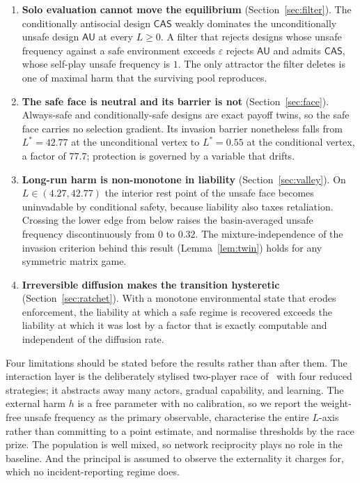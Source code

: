 \documentclass[11pt,a4paper]{article}
\theoremstyle{definition}
\newcommand{\AU}{\textsf{AU}}
\newcommand{\CAS}{\textsf{CAS}}
\begin{document}
\begin{enumerate}
\item \textbf{Solo evaluation cannot move the equilibrium}
(Section~\ref{sec:filter}). The conditionally antisocial design $\CAS$ weakly
dominates the unconditionally unsafe design $\AU$ at every $L\ge0$. A filter
that rejects designs whose unsafe frequency against a safe environment exceeds
$\varepsilon$ rejects $\AU$ and admits $\CAS$, whose self-play unsafe
frequency is $1$. The only attractor the filter deletes is one of maximal
harm that the surviving pool reproduces.

\item \textbf{The safe face is neutral and its barrier is not}
(Section~\ref{sec:face}). Always-safe and conditionally-safe designs are exact
payoff twins, so the safe face carries no selection gradient. Its invasion
barrier nonetheless falls from $L^{*}=42.77$ at the unconditional vertex to
$L^{*}=0.55$ at the conditional vertex, a factor of $77.7$; protection is
governed by a variable that drifts.

\item \textbf{Long-run harm is non-monotone in liability}
(Section~\ref{sec:valley}). On $L\in(4.27,42.77)$ the interior rest point of
the unsafe face becomes uninvadable by conditional safety, because liability
also taxes retaliation. Crossing the lower edge from below raises the
basin-averaged unsafe frequency discontinuously from $0$ to $0.32$. The
mixture-independence of the invasion criterion behind this result
(Lemma~\ref{lem:twin}) holds for any symmetric matrix game.

\item \textbf{Irreversible diffusion makes the transition hysteretic}
(Section~\ref{sec:ratchet}). With a monotone environmental state that erodes
enforcement, the liability at which a safe regime is recovered exceeds the
liability at which it was lost by a factor that is exactly computable and
independent of the diffusion rate.
\end{enumerate}

Four limitations should be stated before the results rather than after them.
The interaction layer is the deliberately stylised two-player race of~\citet{domingos2026falling} with four reduced strategies; it abstracts away
many actors, gradual capability, and learning. The external harm $h$ is a free
parameter with no calibration, so we report the weight-free unsafe frequency
as the primary observable, characterise the entire $L$-axis rather than
committing to a point estimate, and normalise thresholds by the race prize.
The population is well mixed, so network reciprocity plays no role in the
baseline. And the principal is assumed to observe the externality it charges
for, which no incident-reporting regime does.
\end{document}
